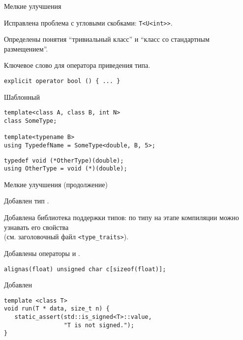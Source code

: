 \documentclass[aspectration=1610,t]{beamer}
\begin{document}
\begin{frame}[fragile]{Мелкие улучшения}
\begin{enumerate}
    \pitem Исправлена проблема с угловыми скобками: {\tt T<U<int{>}>}.

    \pitem Определены понятия ``тривиальный класс'' и ``класс со стандартным размещением''.
    
    \pitem Ключевое слово  для оператора приведения типа.
\begin{lstlisting}
explicit operator bool () { ... }
\end{lstlisting}

    \pitem Шаблонный 
\begin{lstlisting}
template<class A, class B, int N> 
class SomeType;

template<typename B>
using TypedefName = SomeType<double, B, 5>;
\end{lstlisting}
\pause
\begin{lstlisting}
typedef void (*OtherType)(double); 
using OtherType = void (*)(double);
\end{lstlisting}
\end{enumerate}
\end{frame}


\begin{frame}[fragile]{Мелкие улучшения (продолжение)}
\begin{enumerate} \setcounter{enumi}{4}
    \pitem Добавлен тип .

    \pitem Добавлена библиотека поддержки типов: по типу на этапе компиляции можно узнавать его свойства\\ (см. заголовочный файл \texttt{<type\_traits>}).

    \pitem Добавлены операторы  и .
\begin{lstlisting}
alignas(float) unsigned char c[sizeof(float)];
\end{lstlisting}

    \pitem Добавлен 
\begin{lstlisting}
template <class T>
void run(T * data, size_t n) {
   static_assert(std::is_signed<T>::value, 
                 "T is not signed.");
}
\end{lstlisting}

%
% 
\end{enumerate}
\end{frame}
\end{document}
